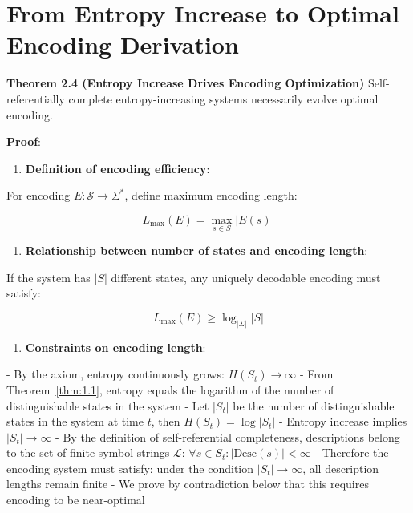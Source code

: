 \section{From Entropy Increase to Optimal Encoding Derivation}
\label{sec:ch02_encoding:from-entropy-increase-to-optimal-encoding-derivation}

\textbf{Theorem 2.4 (Entropy Increase Drives Encoding Optimization)}
\label{thm:2.4}
Self-referentially complete entropy-increasing systems necessarily evolve optimal encoding.

\textbf{Proof}:

\begin{enumerate}
\item \textbf{Definition of encoding efficiency}:
\end{enumerate}
   For encoding $E: \mathcal{S} \to \Sigma^*$, define maximum encoding length:
   
\begin{equation}
L_{\max}(E) = \max_{s \in S} |E(s)|
\end{equation}

\begin{enumerate}
\item \textbf{Relationship between number of states and encoding length}:
\end{enumerate}
   If the system has $|S|$ different states, any uniquely decodable encoding must satisfy:
   
\begin{equation}
L_{\max}(E) \geq \log_{|\Sigma|} |S|
\end{equation}

\begin{enumerate}
\item \textbf{Constraints on encoding length}:
\end{enumerate}
   - By the axiom, entropy continuously grows: $H(S_t) \to \infty$
   - From Theorem~\ref{thm:1.1}, entropy equals the logarithm of the number of distinguishable states in the system
   - Let $|S_t|$ be the number of distinguishable states in the system at time $t$, then $H(S_t) = \log |S_t|$
   - Entropy increase implies $|S_t| \to \infty$
   - By the definition of self-referential completeness, descriptions belong to the set of finite symbol strings $\mathcal{L}$: $\forall s \in S_t: |\text{Desc}(s)| < \infty$
   - Therefore the encoding system must satisfy: under the condition $|S_t| \to \infty$, all description lengths remain finite
   - We prove by contradiction below that this requires encoding to be near-optimal
   

